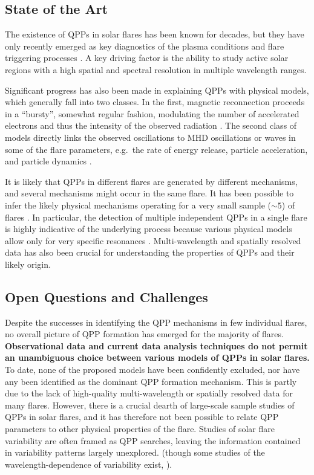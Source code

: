 \documentclass{aastex61}
\begin{document}
\subsection{State of the Art}
The existence of QPPs in solar flares has been known for decades, but they have only recently emerged as key diagnostics of the plasma conditions and flare triggering processes \citep[e.g.][ and references therein]{nakariakov2009}. 
A key driving factor is the ability to study active solar regions with a high spatial and spectral resolution in multiple wavelength ranges. 

Significant progress has also been made in explaining QPPs with physical models, which generally fall into two classes.
In the first, magnetic reconnection proceeds in a ``bursty'', somewhat regular fashion, modulating the number of accelerated electrons and thus the intensity of the observed radiation \citep{kliem2000,ofman2006,murray2009}. 
The second class of models directly links the observed oscillations to MHD oscillations or waves in some of the flare parameters, e.g.\ the rate of energy release, particle acceleration, and particle dynamics \citep{nakariakov2007,pascoe2007}. 

It is likely that QPPs in different flares are generated by different mechanisms, and several mechanisms might occur in the same flare.
It has been possible to infer the likely physical mechanisms operating for a very small sample ($\sim 5$) of flares \citep{asai2001,melnikov2005,inglis2008}. In particular, the detection of multiple independent QPPs in a single flare is highly indicative of the underlying process because various physical models allow only for very specific resonances \citep{melnikov2005,inglis2009}. 
Multi-wavelength and spatially resolved data has also been crucial for understanding the properties of QPPs and their likely origin. 

\subsection{Open Questions and Challenges}
Despite the successes in identifying the QPP mechanisms in few individual flares, no overall picture of QPP formation has emerged for the majority of flares. 
\textbf{Observational data and current data analysis techniques do not permit an unambiguous choice between various models of QPPs in solar flares.}
To date, none of the proposed models have been confidently excluded, nor have any been identified as the dominant QPP formation mechanism. 
This is partly due to the lack of high-quality multi-wavelength or spatially resolved data for many flares. 
However, there is a crucial dearth of large-scale sample studies of QPPs in solar flares, and it has therefore not been possible to relate QPP parameters to other physical properties of the flare. 
Studies of solar flare variability are often framed as QPP searches, leaving the information contained in variability patterns largely unexplored. (though some studies of the wavelength-dependence of variability exist, \citep{mcateer2007}).
\end{document}

